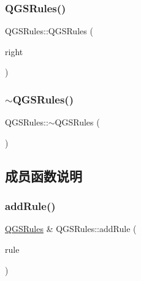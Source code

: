 \subsubsection{\texorpdfstring{Q\+G\+S\+Rules()}{QGSRules()}\hspace{0.1cm}{\footnotesize\ttfamily [4/4]}}
{\footnotesize\ttfamily Q\+G\+S\+Rules\+::\+Q\+G\+S\+Rules (\begin{DoxyParamCaption}\item[{\mbox{\hyperlink{class_q_g_s_rules}{Q\+G\+S\+Rules}} \&\&}]{right }\end{DoxyParamCaption})\hspace{0.3cm}{\ttfamily [default]}}

\mbox{\label{class_q_g_s_rules_a5bcddb7c3b3dad85ad20271fdb0b32ae}} 
\subsubsection{\texorpdfstring{$\sim$\+Q\+G\+S\+Rules()}{~QGSRules()}}
{\footnotesize\ttfamily Q\+G\+S\+Rules\+::$\sim$\+Q\+G\+S\+Rules (\begin{DoxyParamCaption}{ }\end{DoxyParamCaption})}



\subsection{成员函数说明}
\mbox{\label{class_q_g_s_rules_addcca8c9adcede9124e996ac8439df2a}} 
\subsubsection{\texorpdfstring{add\+Rule()}{addRule()}}
{\footnotesize\ttfamily \mbox{\hyperlink{class_q_g_s_rules}{Q\+G\+S\+Rules}} \& Q\+G\+S\+Rules\+::add\+Rule (\begin{DoxyParamCaption}\item[{const \mbox{\hyperlink{class_q_g_s_rules_1_1_q_g_s_rule}{Q\+G\+S\+Rule}} \&}]{rule }\end{DoxyParamCaption})}

